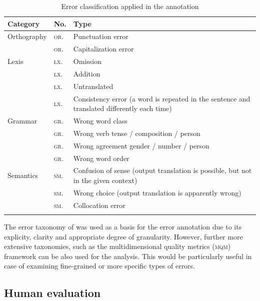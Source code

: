 \documentclass[output=paper]{langsci/langscibook}
\begin{document}
\begin{table}
\begin{tabularx}{\textwidth}{llQ}
\lsptoprule
Category  &
No. &
Type\\
\midrule
Orthography  &  \textsc{or}. & Punctuation error\\
             &  \textsc{or}.  &  Capitalization error\\
\midrule
Lexis  &     \textsc{lx}.   &   Omission\\
       &     \textsc{lx}. &   Addition\\
       &     \textsc{lx}. &   Untranslated\\
       &     \textsc{lx}. &  Consistency error (a word is repeated in the sentence  and translated differently each time)\\
\midrule
Grammar  &   \textsc{gr}.  &    Wrong word class\\
         &   \textsc{gr}.  &    Wrong verb tense / composition / person\\
         &   \textsc{gr}.  &    Wrong agreement gender / number / person\\
         &   \textsc{gr}.  &    Wrong word order\\
\midrule
Semantics & \textsc{sm}. & Confusion of sense (output translation is possible,  but not in the given context)\\
          & \textsc{sm}. &  Wrong choice (output translation is apparently wrong)\\\
          & \textsc{sm}. & Collocation error\\
\lspbottomrule
\end{tabularx}
\caption{Error classification applied in the annotation\label{marzouk:table1}}
\end{table}


The error taxonomy of \citet{Vilar2006} was used as a basis for the error annotation due to its explicity, clarity and appropriate degree of granularity. However, further more extensive taxonomies, such as the multidimensional quality metrics (\textsc{mqm}) framework can be also used for the analysis. This would be particularly useful in case of examining fine-grained or more specific types of errors.


\subsection{Human evaluation}
\end{document}
